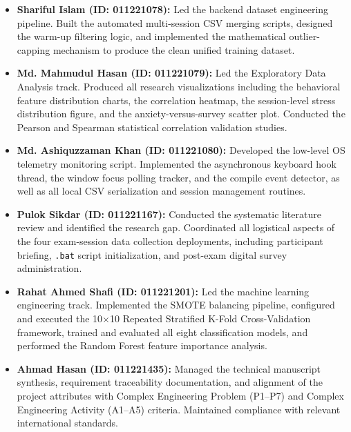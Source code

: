 \begin{itemize}
    \item \textbf{Shariful Islam (ID: 011221078):} Led the backend dataset engineering pipeline. Built the automated multi-session CSV merging scripts, designed the warm-up filtering logic, and implemented the mathematical outlier-capping mechanism to produce the clean unified training dataset.

    \item \textbf{Md. Mahmudul Hasan (ID: 011221079):} Led the Exploratory Data Analysis track. Produced all research visualizations including the behavioral feature distribution charts, the correlation heatmap, the session-level stress distribution figure, and the anxiety-versus-survey scatter plot. Conducted the Pearson and Spearman statistical correlation validation studies.

    \item \textbf{Md. Ashiquzzaman Khan (ID: 011221080):} Developed the low-level OS telemetry monitoring script. Implemented the asynchronous keyboard hook thread, the window focus polling tracker, and the compile event detector, as well as all local CSV serialization and session management routines.

    \item \textbf{Pulok Sikdar (ID: 011221167):} Conducted the systematic literature review and identified the research gap. Coordinated all logistical aspects of the four exam-session data collection deployments, including participant briefing, \texttt{.bat} script initialization, and post-exam digital survey administration.

    \item \textbf{Rahat Ahmed Shafi (ID: 011221201):} Led the machine learning engineering track. Implemented the SMOTE balancing pipeline, configured and executed the 10$\times$10 Repeated Stratified K-Fold Cross-Validation framework, trained and evaluated all eight classification models, and performed the Random Forest feature importance analysis.

    \item \textbf{Ahmad Hasan (ID: 011221435):} Managed the technical manuscript synthesis, requirement traceability documentation, and alignment of the project attributes with Complex Engineering Problem (P1--P7) and Complex Engineering Activity (A1--A5) criteria. Maintained compliance with relevant international standards.
\end{itemize}

